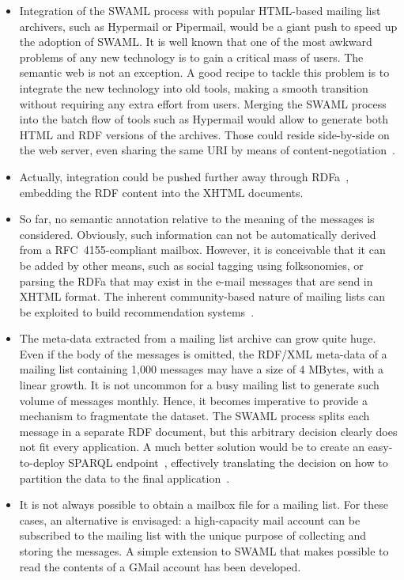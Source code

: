 \documentclass{llncs}
\begin{document}
\begin{itemize}
  \item Integration of the SWAML process with popular HTML-based
        mailing list archivers, such as Hypermail or Pipermail, would be
        a giant push to speed up the adoption of SWAML. It is well
        known that one of the most awkward problems of any new technology
        is to gain a critical mass of users. The semantic web is not
        an exception. A good recipe to tackle this problem is to
        integrate the new technology into old tools, making
        a smooth transition without requiring any extra effort from
        users. Merging the SWAML process into the batch flow of
        tools such as Hypermail would allow to generate both
        HTML and RDF versions of the archives. Those could reside
        side-by-side on the web server, even sharing the same URI
        by means of content-negotiation~\cite{Recipes}.
  \item Actually, integration could be pushed further away through
        RDFa~\cite{Birbeck2006}, embedding the RDF content into the
        XHTML documents.
  \item So far, no semantic annotation relative to the meaning of
        the messages is considered. Obviously, such information can not
        be automatically derived from a RFC~4155-compliant mailbox.
        However, it is
        conceivable that it can be added by other means, such as
        social tagging using folksonomies, or parsing the RDFa
        that may exist in the e-mail messages that are send in XHTML format.
        The inherent community-based nature of mailing lists can
        be exploited to build recommendation systems~\cite{Celma2006}.
  \item The meta-data extracted from a mailing list archive can grow
        quite huge. Even if the body of the messages is omitted, the
        RDF/XML meta-data of a mailing list containing 1,000 messages may
        have a size of 4 MBytes, with a linear growth. It is not uncommon
        for a busy mailing list to generate such volume of messages
        monthly. Hence, it becomes imperative to provide a mechanism to
        fragmentate the dataset. The SWAML process splits each message
        in a separate RDF document, but this arbitrary decision clearly
        does not fit every application. A much better solution would be to
        create an easy-to-deploy SPARQL endpoint~\cite{SPARQLProtocol},
        effectively translating the
        decision on how to partition the data to the final
        application~\cite{Pan2006}.
  \item It is not always possible to obtain a mailbox file for a mailing
        list. For these cases, an alternative is envisaged: a high-capacity
        mail account can be subscribed to the mailing list with the unique
        purpose of collecting and storing the messages. A simple extension
        to SWAML that makes possible to read the contents of a GMail
        account has been developed.

\end{itemize}
\end{document}
